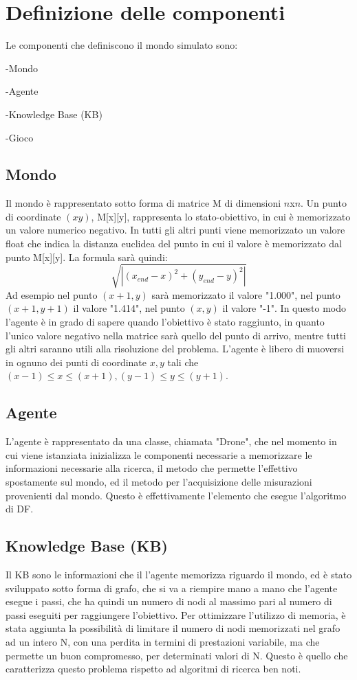 \section{Definizione delle componenti}
Le componenti che definiscono il mondo simulato sono:

-Mondo

-Agente

-Knowledge Base (KB)

-Gioco

\subsection{Mondo}
Il mondo è rappresentato sotto forma di matrice M di dimensioni $n$x$n$. Un punto di coordinate $(x y)$, M[x][y], rappresenta lo stato-obiettivo, in cui è memorizzato un valore numerico negativo. In tutti gli altri punti viene memorizzato un valore float che indica la distanza euclidea del punto in cui il valore è memorizzato dal punto M[x][y]. La formula sarà quindi:
$$\sqrt{|(x_{end} - x)^2 + (y_{end} - y)^2|}$$
Ad esempio nel punto $(x+1, y)$ sarà memorizzato il valore "1.000", nel punto $(x+1, y+1)$ il valore "1.414", nel punto $(x, y)$ il valore "-1". In questo modo l'agente è in grado di sapere quando l'obiettivo è stato raggiunto, in quanto l'unico valore negativo nella matrice sarà quello del punto di arrivo, mentre tutti gli altri saranno utili alla risoluzione del problema.
L'agente è libero di muoversi in ognuno dei punti di coordinate $ x, y $ tali che $ (x-1) \le x \le (x+1), (y-1) \le y \le (y+1) $.

\subsection{Agente}
L'agente è rappresentato da una classe, chiamata "Drone", che nel momento in cui viene istanziata inizializza le componenti necessarie a memorizzare le informazioni necessarie alla ricerca, il metodo che permette l'effettivo spostamente sul mondo, ed il metodo per l'acquisizione delle misurazioni provenienti dal mondo. Questo è effettivamente l'elemento che esegue l'algoritmo di DF.

\subsection{Knowledge Base (KB)}
Il KB sono le informazioni che il l'agente memorizza riguardo il mondo, ed è stato sviluppato sotto forma di grafo, che si va a riempire mano a mano che l'agente esegue i passi, che ha quindi un numero di nodi al massimo pari al numero di passi eseguiti per raggiungere l'obiettivo. Per ottimizzare l'utilizzo di memoria, è stata aggiunta la possibilità di limitare il numero di nodi memorizzati nel grafo ad un intero N, con una perdita in termini di prestazioni variabile, ma che permette un buon compromesso, per determinati valori di N. Questo è quello che caratterizza questo problema rispetto ad algoritmi di ricerca ben noti.

